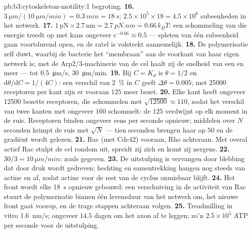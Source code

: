 \begin{solution}{pb:b3:cytoskeleton-motility:1}
begroting.
\textbf{16.} $\qty{3}{\micro m}/(\qty{10}{\micro m/min}) = \qty{0.3}{min}
= \qty{18}{s}$; $2.5\times 10^{5}\times 18 = 4.5\times 10^{6}$
subeenheden in het netwerk.
\textbf{17.} $1\,\text{pN}\times 2.7\,\text{nm} = \qty{2.7}{pN.nm} =
0.66\,k_{B}T$: een schommeling van die energie treedt op met kans
ongeveer $e^{-0.66} \approx 0.5$ --- spleten van één subeenheid gaan
voortdurend open, en de ratel is volstrekt aannemelijk.
\textbf{18.} De polymerisatie zelf duwt, waarbij de bacterie het
``membraan'' aan de voorkant van haar eigen netwerk is; met de
Arp2/3-machinerie van de cel haalt zij de snelheid van een 
en meer --- tot \qty{0.5}{\micro m/s}, \qty{30}{\micro m/min}.
\textbf{19.} Bij $C = K_{d}$ is $\theta = 1/2$ en $\mathrm{d}\theta/
\mathrm{d}C = 1/(4C)$: een verschil van \qty{2}{\%} in $C$ geeft $\Delta\theta
= 0.005$; met \num{25000} receptoren per kant zijn er vooraan $125$ meer
bezet.
\textbf{20.} Elke kant heeft ongeveer \num{12500} bezette receptoren, die
schommelen met $\sqrt{\num{12500}} \approx 110$, zodat het verschil van
twee kanten met ongeveer $160$ schommelt: de $125$ verdwijnt op elk
moment in de ruis. Receptoren binden ongeveer eens per seconde opnieuw;
middelen over $N$ seconden krimpt de ruis met $\sqrt{N}$ --- tien
seconden brengen haar op $50$ en de gradiënt wordt gelezen.
\textbf{21.} Rac (met Cdc42) vooraan, Rho achteraan. Met overal actief
Rac stulpt de cel rondom uit, spreidt zij zich en komt zij nergens.
\textbf{22.} $30/3 = \qty{10}{\micro m/min}$: zoals gegeven.
\textbf{23.} De uitstulping is vervangen door blebbing dat door druk
wordt gedreven; hechting en samentrekking hangen nog steeds van actine
en  af, zodat actine voor de rest van de cyclus onmisbaar
blijft.
\textbf{24.} Het front wordt elke \qty{18}{s} opnieuw gebouwd: een
verschuiving in de activiteit van Rac stuurt de polymerisatie binnen één
levensduur van het netwerk om, het nieuwe front gaat voorop, en de
trage stappen achteraan volgen.
\textbf{25.} Treadmilling in vitro \qty{1.6}{nm/s}; ongeveer $14.5$
dagen om het axon af te leggen; zo'n $2.5\times 10^{5}$ ATP per seconde
voor de uitstulping.
\end{solution}
